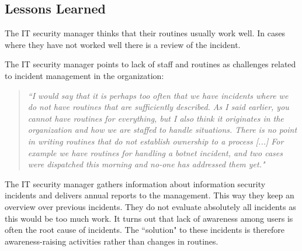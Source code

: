 \documentclass[b5paper, twoside, openright, 11pt]{report}
\begin{document}
\subsection{Lessons Learned}
The IT security manager thinks that their routines usually work well. In cases where they have not worked well there is a review of the incident.


The IT security manager points to lack of staff and routines as challenges related to incident management in the organization: 

\begin{quote}
\textit{``I would say that it is perhaps too often that we have incidents where we do not have routines that are sufficiently described. %
As I said earlier, you cannot have routines for everything, but I also think it originates in the organization and how we are staffed to handle situations. There is no point in writing routines that do not establish ownership to a process [...] For example we have routines for handling a botnet incident, and two cases were dispatched this morning and no-one has addressed them yet."}
\end{quote}

The IT security manager gathers information about information security incidents and delivers annual reports to the management. This way they keep an overview over previous incidents. They do not evaluate absolutely all incidents as this would be too much work. It turns out that lack of awareness among users is often the root cause of incidents. The ``solution" to these incidents is therefore awareness-raising activities rather than changes in routines.
\end{document}

